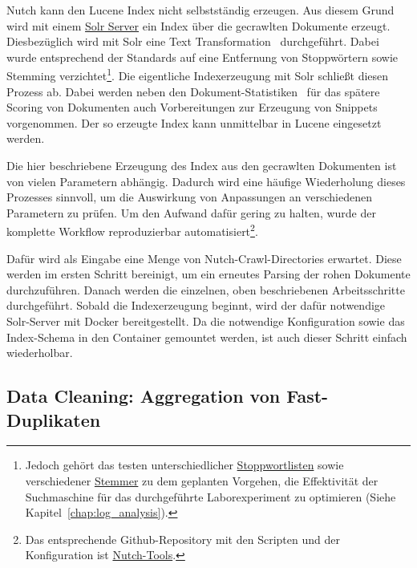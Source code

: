Nutch kann den Lucene Index nicht selbstständig erzeugen.
Aus diesem Grund wird mit einem \href{http://lucene.apache.org/solr/}{Solr Server} ein Index über die gecrawlten Dokumente erzeugt.
Diesbezüglich wird mit Solr eine Text Transformation~\cite{croft.chap2} durchgeführt.
Dabei wurde entsprechend der Standards auf eine Entfernung von Stoppwörtern sowie Stemming
verzichtet\footnote{Jedoch gehört das testen unterschiedlicher 
\href{https://github.com/apache/lucene-solr/blob/master/lucene/analysis/common/src/java/org/apache/lucene/analysis/core/StopFilterFactory.java}{Stoppwortlisten} sowie verschiedener
\href{https://github.com/apache/lucene-solr/blob/master/lucene/analysis/common/src/java/org/apache/lucene/analysis/en/PorterStemFilterFactory.java}{Stemmer}
zu dem geplanten Vorgehen,
die Effektivität der Suchmaschine für das durchgeführte Laborexperiment zu optimieren (Siehe Kapitel~\ref{chap:log_analysis}).}.
Die eigentliche Indexerzeugung mit Solr schließt diesen Prozess ab.
Dabei werden neben den Dokument-Statistiken~\cite{croft.chap2} für das spätere Scoring von Dokumenten auch Vorbereitungen zur Erzeugung von Snippets vorgenommen.
Der so erzeugte Index kann unmittelbar in Lucene eingesetzt werden.

Die hier beschriebene Erzeugung des Index aus den gecrawlten Dokumenten ist von vielen Parametern abhängig.
Dadurch wird eine häufige Wiederholung dieses Prozesses sinnvoll, um die Auswirkung von Anpassungen an verschiedenen Parametern zu prüfen.
Um den Aufwand dafür gering zu halten, wurde der komplette Workflow reproduzierbar automatisiert\footnote{Das
entsprechende Github-Repository mit
den Scripten und der Konfiguration ist \href{https://github.com/mam10eks/nutch_tools/}{Nutch-Tools}.}.

Dafür wird als Eingabe eine Menge von Nutch-Crawl-Directories erwartet.
Diese werden im ersten Schritt bereinigt, um ein erneutes Parsing der rohen Dokumente durchzuführen.
Danach werden die einzelnen, oben beschriebenen Arbeitsschritte durchgeführt.
Sobald die Indexerzeugung beginnt, wird der dafür notwendige Solr-Server mit Docker
bereitgestellt. Da die notwendige Konfiguration sowie das Index-Schema in den Container gemountet werden,
ist auch dieser Schritt einfach wiederholbar.

\subsection{Data Cleaning: Aggregation von Fast-Duplikaten}
\label{chap:near_duplicate_detection}

